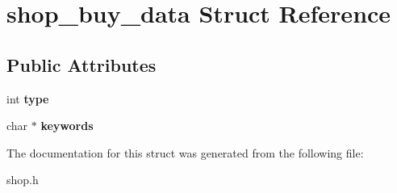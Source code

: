 \hypertarget{structshop__buy__data}{}\section{shop\+\_\+buy\+\_\+data Struct Reference}
\label{structshop__buy__data}
\subsection*{Public Attributes}
\begin{DoxyCompactItemize}
\item 
\mbox{\label{structshop__buy__data_a3b55d62930ab26d56aae082ea6e19baf}} 
int {\bfseries type}
\item 
\mbox{\label{structshop__buy__data_afdee6df01660797b8b2ab5157a62cac3}} 
char $\ast$ {\bfseries keywords}
\end{DoxyCompactItemize}


The documentation for this struct was generated from the following file\+:\begin{DoxyCompactItemize}
\item 
shop.\+h\end{DoxyCompactItemize}
